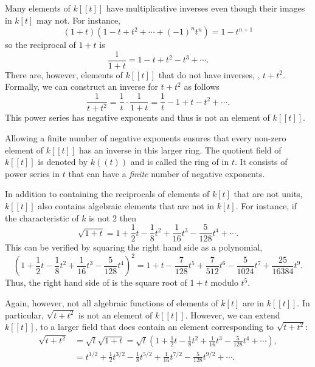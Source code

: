 Many elements of $k[[t]]$ have multiplicative inverses even though
their images in $k[t]$ may not.  For instance,
\[
(1 + t) (1 - t + t^2 + \cdots + (-1)^n t^n) = 1 - t^{n+1}
\]
so the reciprocal of $1+t$ is
\[
\frac{1}{1+t} = 1 - t + t^2 - t^3 + \cdots.
\]
There are, however, elements of $k[[t]]$ that do not have inverses,
\eg, $t + t^2$.  Formally, we can construct an inverse for $t+t^2$ as
follows
\[
\frac{1}{t+t^2} = \frac{1}{t} \cdot \frac{1}{1+t} = 
\frac{1}{t} - 1 + t - t^2 + \cdots.
\]
This power series has negative exponents and thus is not an element of
$k[[t]]$.  

Allowing a finite number of negative exponents ensures that every
non-zero element of $k[[t]]$ has an inverse in this larger ring.  The
quotient field of $k[[t]]$ is denoted by $k((t))$ and is called the
ring of  in $t$.  It consists of power
series in $t$ that can have a {\em finite} number of negative
exponents.

\smallskip
In addition to containing the reciprocals of elements of $k[t]$ that
are not units, $k[[t]]$ also contains algebraic elements that are not
in $k[t]$.  For instance, if the characteristic of $k$ is not $2$
then
\begin{equation} \label{Sqrt1+x:Eq}
\sqrt{1+t} = 1 + \frac{1}{2} t - \frac{1}{8}t^2 + \frac{1}{16} t^3 -
\frac{5}{128} t^4 + \cdots.
\end{equation}
This can be verified by squaring the right hand side as a polynomial,
\[
\left(1 + \frac{1}{2} t - \frac{1}{8}t^2 + \frac{1}{16} t^3 -
\frac{5}{128} t^4\right)^2 =
1 + t - \frac{7}{128}t^5 + \frac{7}{512}t^6
- \frac{5}{1024} t^7
+ \frac{25}{16384} t^9.
\]
Thus, the right hand side of  is the square root of
$1+t$ modulo $t^5$.  

Again, however, not all algebraic functions of elements of $k[t]$ are
in $k[[t]]$.  In particular, $\sqrt{t+t^2}$ is not an element of
$k[[t]]$.  However, we can extend $k[[t]]$, to a larger field that
does contain an element corresponding to $\sqrt{t+t^2}$:
\[
\begin{aligned}
\sqrt{t+t^2} &= \sqrt{t}\sqrt{1+t} 
  = \sqrt{t}\left(1 + \frac{1}{2} t - \frac{1}{8}t^2 + \frac{1}{16} t^3 -
  \frac{5}{128} t^4 + \cdots\right),\\
& = t^{1/2} + \frac{1}{2} t^{3/2} - \frac{1}{8}t^{5/2} + \frac{1}{16} t^{7/2} -
  \frac{5}{128} t^{9/2} + \cdots.
\end{aligned}
\]

